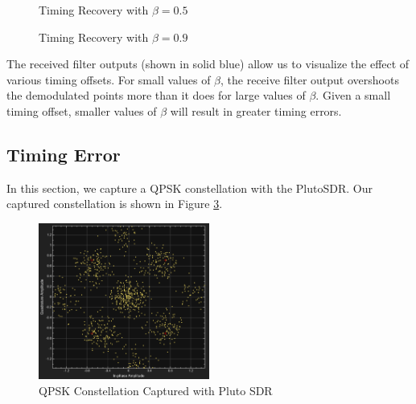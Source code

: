 \documentclass{article}
\begin{document}
\begin{figure}[H]
	\centerline{}
	\caption{Timing Recovery with $\beta=0.5$}
	\label{fig::timing_recovery_beta_0_5}
\end{figure}

\begin{figure}[H]
	\centerline{}
	\caption{Timing Recovery with $\beta=0.9$}
	\label{fig::timing_recovery_beta_0_9}
\end{figure}

\noindent The received filter outputs (shown in solid blue) allow us to visualize the effect of various timing offsets. For small values of $\beta$, the receive filter output overshoots the demodulated points more than it does for large values of $\beta$. Given a small timing offset, smaller values of $\beta$ will result in greater timing errors.

\subsection{Timing Error}

In this section, we capture a QPSK constellation with the PlutoSDR. Our captured constellation is shown in Figure \ref{fig::pluto_constellation_raw}.

\begin{figure}[H]
	\centerline{\includegraphics[width=0.5\textwidth]{pluto_constellation_raw.png}}
	\caption{QPSK Constellation Captured with Pluto SDR}
	\label{fig::pluto_constellation_raw}
\end{figure}
\end{document}
